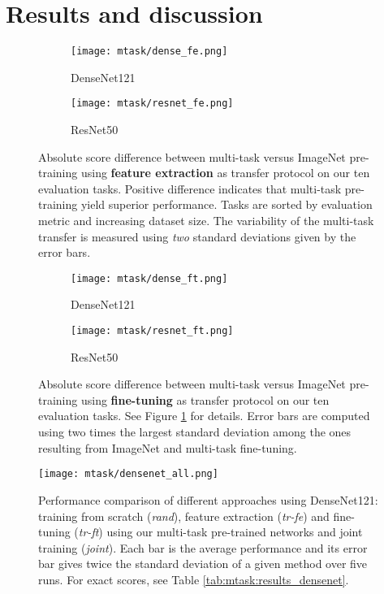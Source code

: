 \section{Results and discussion}
\label{sec:mtask:results}
\begin{figure}[t]
    \center
    \begin{subfigure}[t]{0.70\textwidth}
        \centering
        \texttt{[image: mtask/dense\_fe.png]}
        \caption{DenseNet121}
    \end{subfigure}    
    \begin{subfigure}[t]{0.70\textwidth}
        \centering
        \texttt{[image: mtask/resnet\_fe.png]}
        \caption{ResNet50}
    \end{subfigure}    
    \caption{Absolute score difference between multi-task versus ImageNet pre-training using \textbf{feature extraction} as transfer protocol on our ten evaluation tasks. Positive difference indicates that multi-task pre-training yield superior performance. Tasks are sorted by evaluation metric and increasing dataset size. The variability of the multi-task transfer is measured using \textit{two} standard deviations given by the error bars.}  
    \label{fig:mtask:res_featext}
\end{figure}

\begin{figure}[t]
    \centering
    \begin{subfigure}[t]{0.70\textwidth}
        \centering
        \texttt{[image: mtask/dense\_ft.png]}
        \caption{DenseNet121}
    \end{subfigure}    
    \begin{subfigure}[t]{0.70\textwidth}
        \centering
        \texttt{[image: mtask/resnet\_ft.png]}\\
        \caption{ResNet50}
    \end{subfigure}    
    \caption{Absolute score difference between multi-task versus ImageNet pre-training using \textbf{fine-tuning} as transfer protocol on our ten evaluation tasks. See Figure \ref{fig:mtask:res_featext} for details. Error bars are computed using two times the largest standard deviation among the ones resulting from ImageNet and multi-task fine-tuning.}  
    \label{fig:mtask:res_finetune}
\end{figure}

\begin{figure}[t]
    \centering
    \texttt{[image: mtask/densenet\_all.png]}
    \caption{Performance comparison of different approaches using DenseNet121: training from scratch (\textit{rand}), feature extraction (\textit{tr-fe}) and fine-tuning (\textit{tr-ft}) using our multi-task pre-trained networks and joint training (\textit{joint}). Each bar is the average performance and its error bar gives twice the standard deviation of a given method over five runs. For exact scores, see Table \ref{tab:mtask:results_densenet}.}  
    \label{fig:mtask:res_all_densenet}
\end{figure}

